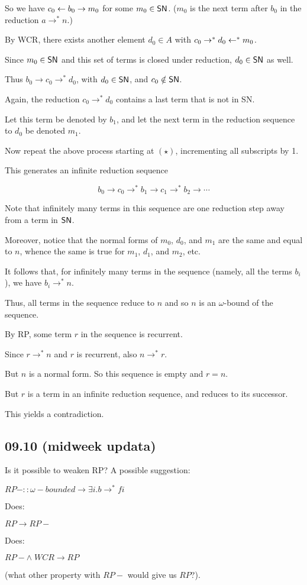 \documentclass{scrartcl}
\begin{document}
\begin{itemize}
  So we have $c_0 \leftarrow b_0 \to m_0$ for some $m_0 \in \mathsf{SN}$. ($m_0$ is the next term after $b_0$ in the reduction $a \to^* n$.)

  By WCR, there exists another element $d_0 \in A$ with $c_0 \to^* d_0 \leftarrow^* m_0$.

  Since $m_0 \in \mathsf{SN}$ and this set of terms is closed under reduction, $d_0 \in \mathsf{SN}$ as well.

  Thus $b_0 \to c_0 \to^* d_0$, with $d_0 \in \mathsf{SN}$, and $c_0 \notin \mathsf{SN}$.

  Again, the reduction $c_0 \to^* d_0$ contains a last term that is not in SN.

  Let this term be denoted by $b_1$, and let the next term in the reduction sequence
  to $d_0$ be denoted $m_1$.

  Now repeat the above process starting at $(\star)$, incrementing all subscripts by 1.

  This generates an infinite reduction sequence

  \[b_0 \to c_0 \to^* b_1 \to c_1 \to^* b_2 \to \cdots \]

  Note that infinitely many terms in this sequence are one reduction step
  away from a term in $\mathsf{SN}$.

  Moreover, notice that the normal forms of $m_0$, $d_0$, and $m_1$ are the same
  and equal to $n$, whence the same is true for $m_1$, $d_1$, and $m_2$, etc.

  It follows that, for infinitely many terms in the sequence
  (namely, all the terms $b_i$), we have $b_i \to^* n$.

  Thus, all terms in the sequence reduce to $n$ and so $n$ is an $\omega$-bound
  of the sequence.

  By RP, some term $r$ in the sequence is recurrent.

  Since $r \to^* n$ and $r$ is recurrent, also $n \to^* r$.

  But $n$ is a normal form.  So this sequence is empty and $r=n$.

  But $r$ is a term in an infinite reduction sequence, and reduces to its successor.

  This yields a contradiction.

\end{itemize}
\subsection{09.10 (midweek updata)}
Is it possible to weaken RP? A possible suggestion:

$RP- :: \omega-bounded \to  \exists i. b \to^* f i$

Does:

$RP \to RP-$

Does: 

$RP- \land \; WCR \to RP$

(what other property with $RP-$ would give us $RP$?).
\end{document}

